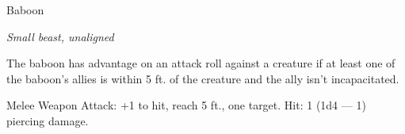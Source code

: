 \begin{monsterbox}{Baboon}
\begin{hangingpar}
\textit{Small beast, unaligned}
\end{hangingpar}
\dndline%
\basics[%
armorclass = 12,
hitpoints = 1d6,
speed = {30 ft., climb 30 ft.}
]
\dndline%
\stats[%
STR = \stat{8},
DEX = \stat{14},
CON = \stat{11},
INT = \stat{4},
WIS = \stat{12},
CHA = \stat{6}
]
\dndline%
\details[%
skills={},
damageimmunities={},
savingthrows={},
conditionimmunities={},
damageresistances={},
damagevulnerabilities={},
senses={passive Perception 11},
challenge=0
]
\dndline%
\begin{monsteraction}
The baboon has advantage on an attack roll against a creature if at least one of the baboon's allies is within 5 ft. of the creature and the ally isn't incapacitated.
\end{monsteraction}
\begin{monsteraction}[Bite]
Melee Weapon Attack: +1 to hit, reach 5 ft., one target. Hit: 1 (1d4 — 1) piercing damage.
\end{monsteraction}
\end{monsterbox}